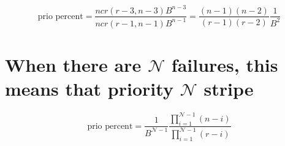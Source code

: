 \documentclass[journal]{IEEEtran}
\begin{document}
\begin{equation*}
  \text{prio percent}=\frac{ncr(r-3,n-3)B^{n-3}}{ncr(r-1,n-1)B^{n-1}}=\frac{(n-1)(n-2)}{(r-1)(r-2)}\frac{1}{B^2}
\end{equation*}

\section{When there are $\mathcal{N}$ failures, this means that priority $\mathcal{N}$ stripe}
\begin{equation*}
  \text{prio percent}=\frac{1}{B^{\mathcal{N}-1}}\frac{\prod_{i=1}^{\mathcal{N}-1}(n-i)}{\prod_{i=1}^{\mathcal{N}-1}(r-i)}
\end{equation*}
\end{document}
